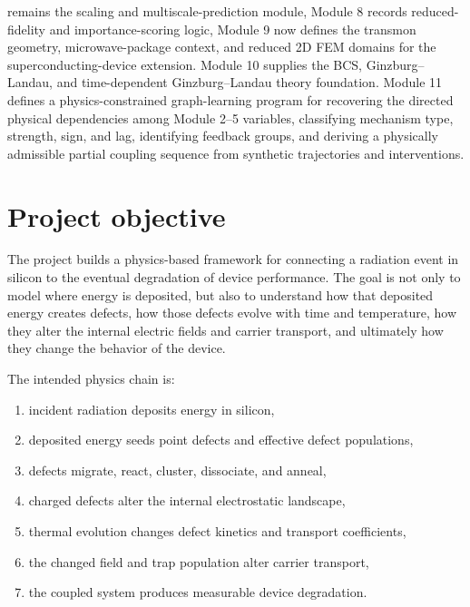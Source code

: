 \documentclass[11pt]{article}
\begin{document}
\begin{notebox}
remains the scaling and multiscale-prediction module, Module 8 records reduced-fidelity and importance-scoring logic, Module 9 now defines the transmon geometry, microwave-package context, and reduced 2D FEM domains for the superconducting-device extension. Module 10 supplies the BCS, Ginzburg--Landau, and time-dependent Ginzburg--Landau theory foundation. Module 11 defines a physics-constrained graph-learning program for recovering the directed physical dependencies among Module 2--5 variables, classifying mechanism type, strength, sign, and lag, identifying feedback groups, and deriving a physically admissible partial coupling sequence from synthetic trajectories and interventions.
\end{notebox}

\section{Project objective}
The project builds a physics-based framework for connecting a radiation event in silicon to the eventual degradation of device performance. The goal is not only to model where energy is deposited, but also to understand how that deposited energy creates defects, how those defects evolve with time and temperature, how they alter the internal electric fields and carrier transport, and ultimately how they change the behavior of the device.

The intended physics chain is:
\begin{enumerate}[leftmargin=1.6em]
    \item incident radiation deposits energy in silicon,
    \item deposited energy seeds point defects and effective defect populations,
    \item defects migrate, react, cluster, dissociate, and anneal,
    \item charged defects alter the internal electrostatic landscape,
    \item thermal evolution changes defect kinetics and transport coefficients,
    \item the changed field and trap population alter carrier transport,
    \item the coupled system produces measurable device degradation.
\end{enumerate}
\end{document}
